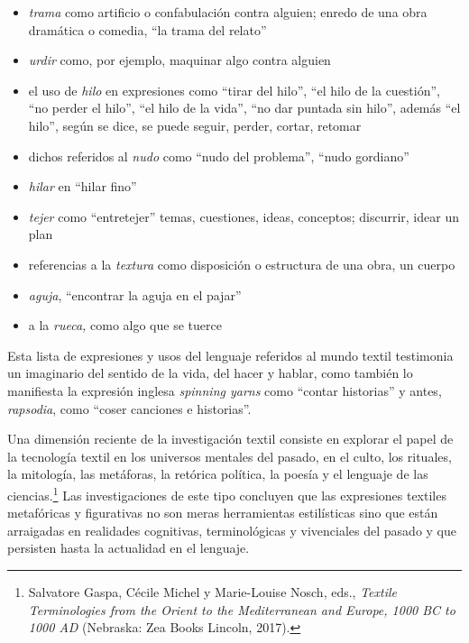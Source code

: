 \documentclass{tufte-handout}
\begin{document}
\begin{itemize}
\item
  \emph{trama} como artificio o confabulación contra alguien; enredo de
  una obra dramática o comedia, ``la trama del relato''
\item
  \emph{urdir} como, por ejemplo, maquinar algo contra alguien
\item
  el uso de \emph{hilo} en expresiones como ``tirar del hilo'', ``el
  hilo de la cuestión'', ``no perder el hilo'', ``el hilo de la vida'',
  ``no dar puntada sin hilo'', además ``el hilo'', según se dice, se
  puede seguir, perder, cortar, retomar
\item
  dichos referidos al \emph{nudo} como ``nudo del problema'', ``nudo
  gordiano''
\item
  \emph{hilar} en ``hilar fino''
\item
  \emph{tejer} como ``entretejer'' temas, cuestiones, ideas, conceptos;
  discurrir, idear un plan
\item
  referencias a la \emph{textura} como disposición o estructura de una
  obra, un cuerpo
\item
  \emph{aguja}, ``encontrar la aguja en el pajar''
\item
  a la \emph{rueca,} como algo que se tuerce
\end{itemize}

Esta lista de expresiones y usos del lenguaje referidos al mundo textil
testimonia un imaginario del sentido de la vida, del hacer y hablar,
como también lo manifiesta la expresión inglesa \emph{spinning yarns}
como ``contar historias'' y antes, \emph{rapsodia}, como ``coser
canciones e historias''.

Una dimensión reciente de la investigación textil consiste en explorar
el papel de la tecnología textil en los universos mentales del pasado,
en el culto, los rituales, la mitología, las metáforas, la retórica
política, la poesía y el lenguaje de las ciencias.\footnote{Salvatore
  Gaspa, Cécile Michel y Marie-Louise Nosch, eds., \emph{Textile
  Terminologies from the Orient to the Mediterranean and Europe, 1000 BC
  to 1000 AD} (Nebraska: Zea Books Lincoln, 2017).} Las investigaciones
de este tipo concluyen que las expresiones textiles metafóricas y
figurativas no son meras herramientas estilísticas sino que están
arraigadas en realidades cognitivas, terminológicas y vivenciales del
pasado y que persisten hasta la actualidad en el lenguaje.
\end{document}
